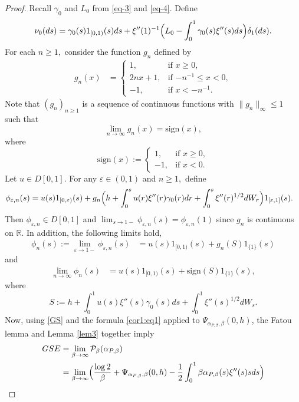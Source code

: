 \documentclass[12pt]{article}
\newenvironment{Proof of lemma}{\noindent{\bf Proof of Lemma}}{\hfill$\Box$\newline}
\newenvironment{Proof of theorem}{\noindent{\bf Proof of Theorem}}{\hfill{\footnotesize${\square}$}\newline}
\newenvironment{Proof of theorems}{\noindent{\bf Proof of Theorems}}{\hfill$\Box$\newline}
\newenvironment{Proof of proposition}{\noindent{\bf Proof of Proposition}}{\hfill$\Box$\newline}
\newenvironment{Proof of propositions}{\noindent{\bf Proof of Propositions}}{\hfill$\Box$\newline}
\newenvironment{Proof of exercise}{\noindent{\it Proof of Exercise:}}{\hfill$\Box$}
\begin{document}
\begin{proof}
	Recall $\gamma_0$ and $L_0$ from \eqref{eq-3} and \eqref{eq-4}.
	Define $$
	\nu_0(ds)=\gamma_0(s)1_{[0,1)}(s)ds+\xi''(1)^{-1}\Bigl(L_0-\int_0^1\gamma_0(s)\xi''(s)ds\Bigr)\delta_1(ds).
	$$
	For each $n\geq 1,$ consider the function $g_n$ defined by
	\begin{align*}
	g_n(x)&=\left\{
	\begin{array}{ll}
	1,&\mbox{if $x\geq 0$},\\
	2nx+1,&\mbox{if $-n^{-1}\leq x<0$},\\
	-1,&\mbox{if $x<-n^{-1}$.}
	\end{array}
	\right.
	\end{align*}
	Note that $(g_n)_{n\geq 1}$ is a sequence of continuous functions with $\|g_n\|_\infty\leq 1$ such that 
	$$
	\lim_{n\rightarrow \infty}g_n(x)=\mbox{sign}(x),
	$$
	where
	 $$
	 \mbox{sign}(x):=\left\{
	 \begin{array}{ll}
	 1,&\mbox{if $x\geq 0$},\\
	 -1,&\mbox{if $x<0$}.
	 \end{array}
	 \right.
	 $$
	Let $u\in D[0,1]$. For any $\varepsilon\in(0,1)$ and $n\geq 1,$ define
	\begin{align*}
	\phi_{\varepsilon,n}(s)&=u(s)1_{[0,\varepsilon)}(s)+g_n\Bigl(h+\int_0^su(r)\xi''(r)\gamma_0(r)dr+\int_0^s\xi''(r)^{1/2}dW_r\Bigr)1_{[\varepsilon,1]}(s).
	\end{align*}
	Then $\phi_{\varepsilon,n}\in D[0,1]$ and $\lim_{s\rightarrow 1-}\phi_{\varepsilon,n}(s)=\phi_{\varepsilon,n}(1)$ since $g_n$ is continuous on $\mathbb{R}$. In addition, the following limits hold,
	\begin{align*}
	\phi_{n}(s):=\lim_{\varepsilon\rightarrow 1-}\phi_{\varepsilon,n}(s)&=
	u(s)1_{[0,1)}(s)+g_n(S)1_{\{1\}}(s)
	\end{align*}
	and
	\begin{align*}
			\lim_{n\rightarrow\infty}\phi_n(s)&=u(s)1_{[0,1)}(s)+\mbox{sign}(S)1_{\{1\}}(s),
	\end{align*}
	where 
	$$
	S:=h+\int_{0}^1 u(s)\xi''(s)\gamma_0(s)ds+\int_0^1\xi''(s)^{1/2}dW_s.
	 $$
	Now, using \eqref{GS} and the formula \eqref{cor1:eq1} applied to $\Psi_{\alpha_{P,\beta},\beta}(0,h)$, the Fatou lemma and Lemma \ref{lem3} together imply
	\begin{align*}
	GSE&=\lim_{\beta\rightarrow\infty}\mathcal{P}_\beta(\alpha_{P,\beta})\\
	&=\lim_{\beta\rightarrow\infty}\Bigl(\frac{\log 2}{\beta}+\Psi_{\alpha_{P,\beta},\beta}(0,h)-\frac{1}{2}\int_0^1\beta\alpha_{P,\beta}(s)\xi''(s)sds\Bigr)\\

\end{align*}
\end{proof}
\end{document}
